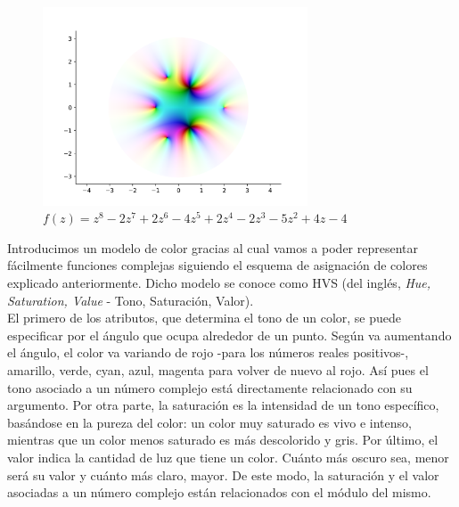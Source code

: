 \begin{figure}[!htbp]
    \centering
    \includegraphics[width=0.7\textwidth]{../Aplicacion/z^8-2z^7+2z^6-4z^5+2z^4-2z^3-5z^2+4z-4.png}
    \caption{$f(z) = z^8-2z^7+2z^6-4z^5+2z^4-2z^3-5z^2+4z-4$}
    \label{fig:z^8-2z^7+2z^6-4z^5+2z^4-2z^3-5z^2+4z-4}
\end{figure}

Introducimos un modelo de color gracias al cual vamos a poder representar fácilmente funciones complejas siguiendo el esquema de asignación de colores explicado anteriormente. Dicho modelo se conoce como HVS (del inglés, \textit{Hue, Saturation, Value} - Tono, Saturación, Valor). \\

El primero de los atributos, que determina el tono de un color, se puede especificar por el ángulo que ocupa alrededor de un punto. Según va aumentando el ángulo, el color va variando de rojo -para los números reales positivos-, amarillo, verde, cyan, azul, magenta para volver de nuevo al rojo. Así pues el tono asociado a un número complejo está directamente relacionado con su argumento. Por otra parte, la saturación es la intensidad de un tono específico, basándose en la pureza del color: un color muy saturado es vivo e intenso, mientras que un color menos saturado es más descolorido y gris. Por último, el valor indica la cantidad de luz que tiene un color. Cuánto más oscuro sea, menor será su valor y cuánto más claro, mayor. De este modo, la saturación y el valor asociadas a un número complejo están relacionados con el módulo del mismo. \\

